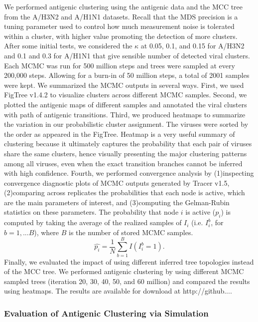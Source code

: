 \documentclass[11pt,oneside,letterpaper]{article}
\begin{document}
We performed antigenic clustering using the antigenic data and the MCC tree from the A/H3N2 and A/H1N1 datasets. 
Recall that the MDS precision is a tuning parameter used to control how much measurement noise is tolerated within a cluster, with higher value promoting the detection of more clusters. 
After some initial tests, we considered the $\kappa$ at 0.05, 0.1, and 0.15 for A/H3N2 and 0.1 and 0.3 for A/H1N1 that give sensible number of detected viral clusters.  
Each MCMC was run for 500 million steps and trees were sampled at every 200,000 steps. 
Allowing for a burn-in of 50 million steps, a total of 2001 samples were kept.
We summarized the MCMC outputs in several ways. 
First, we used FigTree v1.4.2 to visualize clusters across different  MCMC samples. 
Second, we plotted the antigenic maps of different samples and annotated the viral clusters with path of antigenic transitions. 
Third, we produced heatmaps to summarize the variation in our probabilistic cluster assignment. 
The viruses were sorted by the order as appeared in the FigTree.
Heatmap is a very useful summary of clustering because it ultimately captures the probability that each pair of viruses share the same clusters, hence visually presenting the major clustering patterns among all viruses, even when the exact transition branches cannot be inferred with high confidence. %
Fourth, we performed convergence analysis by (1)inspecting convergence diagnostic plots of MCMC outputs generated by Tracer v1.5, (2)comparing across replicates the probabilities that each node is active, which are the main parameters of interest, and (3)computing the Gelman-Rubin statistics on these parameters. 
The probability that node $i$ is active ($p_i$) is computed by taking the average of the realized samples of $I_i$ (i.e. $I_i^b$, for $b=1,...B$), where $B$ is the number of stored MCMC samples.
\begin{equation}
 \hat{p_i} = \frac{1}{N} \sum_{b=1}^{B} I(I_i^b  = 1).
\end{equation}
Finally, we evaluated the impact of using different inferred tree topologies instead of the MCC tree. 
We performed antigenic clustering by using different MCMC sampled trees (iteration 20, 30, 40, 50, and 60 million) and compared the results using heatmaps.
The results are available for download at http://github....


\subsubsection*{Evaluation of Antigenic Clustering via Simulation}
\end{document}
